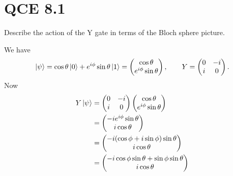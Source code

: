 \documentclass[10pt]{article}
\begin{document}
\section*{QCE 8.1}
Describe the action of the Y gate in terms of the Bloch sphere picture.

We have 
\[
\ket{\psi} = \cos \theta \ket{0} + e^{i\phi} \sin \theta \ket{1} = 
\begin{pmatrix}
\cos \theta \\
e^{i\phi} \sin \theta
\end{pmatrix},
 \qquad Y =
\begin{pmatrix}
0 & -i \\
i  & 0
\end{pmatrix}.
\]
Now
\begin{align*}
Y\ket{\psi} &= 
\begin{pmatrix}
0 & -i \\
i  & 0
\end{pmatrix}
\begin{pmatrix}
\cos \theta \\
e^{i\phi} \sin \theta
\end{pmatrix} \\
&= 
\begin{pmatrix}
-ie^{i\phi} \sin \theta \\
i \cos \theta
\end{pmatrix} \\
&= 
\begin{pmatrix}
-i ( \cos \phi + i \sin \phi ) \sin \theta \\
i \cos \theta
\end{pmatrix} \\
&=
\begin{pmatrix}
-i \cos \phi \sin \theta + \sin \phi \sin \theta \\
i \cos \theta
\end{pmatrix}
\end{align*}
\end{document}
